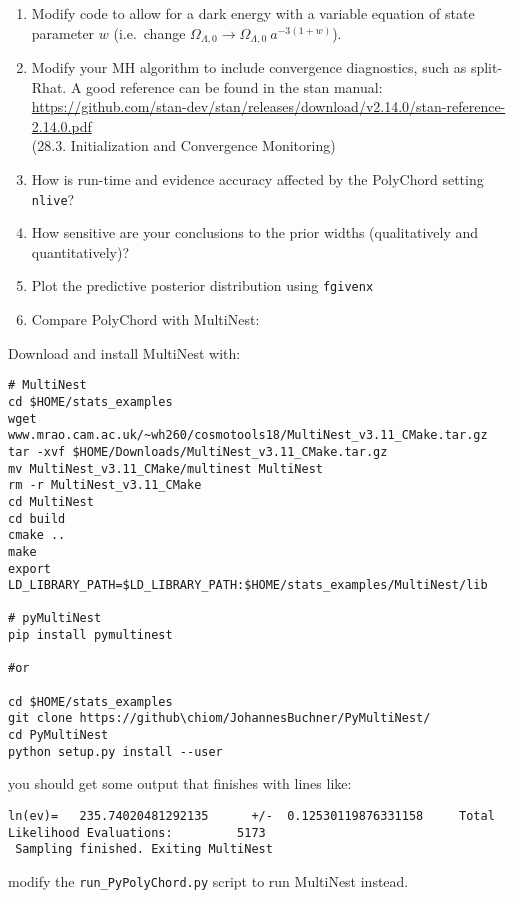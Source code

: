 \documentclass{article}
\begin{document}
\begin{enumerate}[resume]
    \item Modify code to allow for a dark energy with a variable equation of state parameter $w$ (i.e.\ change $\Omega_{\Lambda,0}\to\Omega_{\Lambda,0}\: a^{-3(1+w)}$).
    \item Modify your MH algorithm to include convergence diagnostics, such as split-Rhat. A good reference can be found in the stan manual:\\
        \url{https://github.com/stan-dev/stan/releases/download/v2.14.0/stan-reference-2.14.0.pdf}\\ 
        (28.3. Initialization and Convergence Monitoring)

    \item How is run-time and evidence accuracy affected by the PolyChord setting \texttt{nlive}?
    \item How sensitive are your conclusions to the prior widths (qualitatively and quantitatively)?
\item Plot the predictive posterior distribution using \texttt{fgivenx}
\item Compare PolyChord with MultiNest:
\end{enumerate}


Download and install MultiNest with:
\begin{verbatim}
# MultiNest
cd $HOME/stats_examples
wget www.mrao.cam.ac.uk/~wh260/cosmotools18/MultiNest_v3.11_CMake.tar.gz
tar -xvf $HOME/Downloads/MultiNest_v3.11_CMake.tar.gz
mv MultiNest_v3.11_CMake/multinest MultiNest
rm -r MultiNest_v3.11_CMake
cd MultiNest
cd build
cmake ..
make
export LD_LIBRARY_PATH=$LD_LIBRARY_PATH:$HOME/stats_examples/MultiNest/lib

# pyMultiNest
pip install pymultinest

#or

cd $HOME/stats_examples
git clone https://github\chiom/JohannesBuchner/PyMultiNest/
cd PyMultiNest
python setup.py install --user
\end{verbatim}
you should get some output that finishes with lines like:

\begin{verbatim}
ln(ev)=   235.74020481292135      +/-  0.12530119876331158     Total
Likelihood Evaluations:         5173
 Sampling finished. Exiting MultiNest
\end{verbatim}

modify the \texttt{run_PyPolyChord.py} script to run MultiNest instead.
\end{document}
